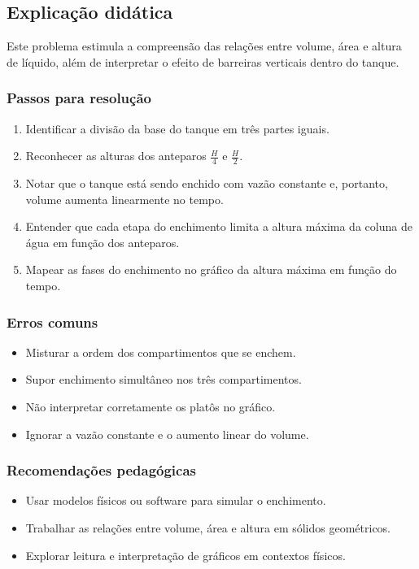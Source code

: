 \documentclass{article}
\begin{document}
\subsection*{Explicação didática}
Este problema estimula a compreensão das relações entre volume, área e altura de líquido, além de interpretar o efeito de barreiras verticais dentro do tanque.

\subsubsection*{Passos para resolução}
\begin{enumerate}
  \item Identificar a divisão da base do tanque em três partes iguais.
  \item Reconhecer as alturas dos anteparos \(\frac{H}{4}\) e \(\frac{H}{2}\).
  \item Notar que o tanque está sendo enchido com vazão constante e, portanto, volume aumenta linearmente no tempo.
  \item Entender que cada etapa do enchimento limita a altura máxima da coluna de água em função dos anteparos.
  \item Mapear as fases do enchimento no gráfico da altura máxima em função do tempo.
\end{enumerate}

\subsubsection*{Erros comuns}
\begin{itemize}
  \item Misturar a ordem dos compartimentos que se enchem.
  \item Supor enchimento simultâneo nos três compartimentos.
  \item Não interpretar corretamente os platôs no gráfico.
  \item Ignorar a vazão constante e o aumento linear do volume.
\end{itemize}

\subsubsection*{Recomendações pedagógicas}
\begin{itemize}
  \item Usar modelos físicos ou software para simular o enchimento.
  \item Trabalhar as relações entre volume, área e altura em sólidos geométricos.
  \item Explorar leitura e interpretação de gráficos em contextos físicos.
\end{itemize}
\end{document}
